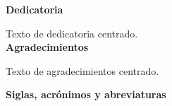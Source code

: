 \newpage
    \thispagestyle{empty}
    


\begin{center}
    \textbf{Dedicatoria}%


    
    Texto de dedicatoria centrado.\\[2cm]
    
    \textbf{Agradecimientos}%
    
    Texto de agradecimientos centrado.    
\end{center} 




\pagestyle{empty}
\renewcommand{\contentsname}{\centerline{\normalfont\normalsize TABLA DE CONTENIDO}}
    \tableofcontents 
    
    
    
\newpage
     \pagestyle{empty}
    \renewcommand{\listtablename}{\centerline{\normalfont\normalsize LISTA DE TABLAS}}
    \listoftables
    
    
    
    
\newpage
    \thispagestyle{empty}
    
    \renewcommand{\listfigurename}{\centerline{\normalfont\normalsize LISTA DE FIGURAS}}
    \listoffigures 
    
    
    
    
\newpage
    \thispagestyle{empty}
    
\begin{center}
    \textbf{Siglas, acrónimos y abreviaturas}    %
\end{center}

